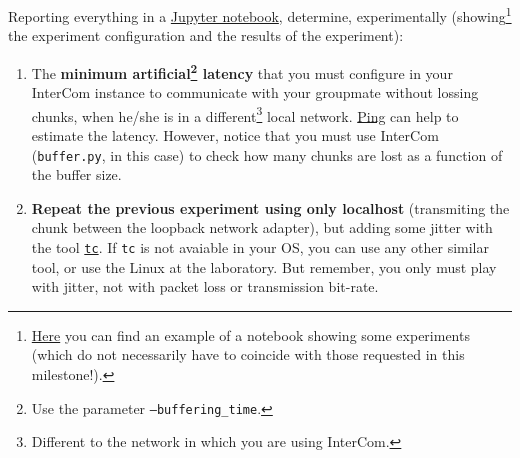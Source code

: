 

Reporting everything in a \href{https://jupyter.org/}{Jupyter
  notebook}, determine, experimentally
(showing\footnote{\href{https://github.com/Tecnologias-multimedia/InterCom/blob/master/docs/Hidding_the_Network_Jitter__example.ipynb}{Here}
  you can find an example of a notebook showing some experiments
  (which do not necessarily have to coincide with those requested in
  this milestone!).} the experiment configuration and the results of
the experiment):
  \begin{enumerate}
  \item The \textbf{minimum artificial\footnote{Use the parameter
        \texttt{--buffering\_time}.} latency} that you must configure
    in your InterCom instance to communicate with your groupmate
    without lossing chunks, when he/she is in a
    different\footnote{Different to the network in which you are using
      InterCom.} local
    network. \href{https://vicente-gonzalez-ruiz.github.io/about_ping/}{Ping}
    can help to estimate the latency. However, notice that you must
    use InterCom (\texttt{buffer.py}, in this case) to check how many chunks are
    lost as a function of the buffer size.
  \item \textbf{Repeat the previous experiment using only localhost}
    (transmiting the chunk between the loopback network adapter), but
    adding some jitter with the tool
    \href{https://vicente-gonzalez-ruiz.github.io/about_tc/}{\texttt{tc}}. If
    \texttt{tc} is not avaiable in your OS, you can use any other
    similar tool, or use the Linux at the laboratory. But remember,
    you only must play with jitter, not with packet loss or
    transmission bit-rate.
  \end{enumerate}
  
